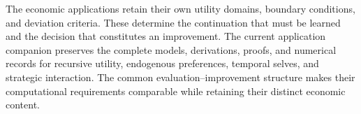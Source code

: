 The economic applications retain their own utility domains, boundary
conditions, and deviation criteria. These determine the continuation
that must be learned and the decision that constitutes an improvement.
The current application companion preserves the complete models,
derivations, proofs, and numerical records for recursive utility,
endogenous preferences, temporal selves, and strategic interaction.
The common evaluation--improvement structure makes their computational
requirements comparable while retaining their distinct economic content.
